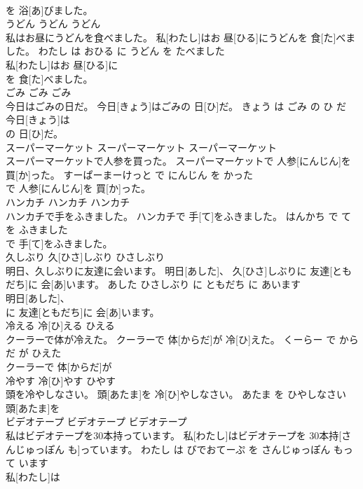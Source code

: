 \documentclass[8pt]{extreport}
\begin{document}
\begin{CJK}{UTF8}{min}
\\	を 浴[あ]びました。			
\\	うどん	うどん	うどん	
\\	私はお昼にうどんを食べました。	私[わたし]はお 昼[ひる]にうどんを 食[た]べました。	わたし は おひる に うどん を たべました	
\\	私[わたし]はお 昼[ひる]に
\\	を 食[た]べました。			
\\	ごみ	ごみ	ごみ	
\\	今日はごみの日だ。	今日[きょう]はごみの 日[ひ]だ。	きょう は ごみ の ひ だ	
\\	今日[きょう]は
\\	の 日[ひ]だ。			
\\	スーパーマーケット	スーパーマーケット	スーパーマーケット	
\\	スーパーマーケットで人参を買った。	スーパーマーケットで 人参[にんじん]を 買[か]った。	すーぱーまーけっと で にんじん を かった	
\\	で 人参[にんじん]を 買[か]った。			
\\	ハンカチ	ハンカチ	ハンカチ	
\\	ハンカチで手をふきました。	ハンカチで 手[て]をふきました。	はんかち で て を ふきました	
\\	で 手[て]をふきました。			
\\	久しぶり	久[ひさ]しぶり	ひさしぶり	
\\	明日、久しぶりに友達に会います。	明日[あした]、 久[ひさ]しぶりに 友達[ともだち]に 会[あ]います。	あした ひさしぶり に ともだち に あいます	
\\	明日[あした]、
\\	に 友達[ともだち]に 会[あ]います。			
\\	冷える	冷[ひ]える	ひえる	
\\	クーラーで体が冷えた。	クーラーで 体[からだ]が 冷[ひ]えた。	くーらー で からだ が ひえた	
\\	クーラーで 体[からだ]が
\\	冷やす	冷[ひ]やす	ひやす	
\\	頭を冷やしなさい。	頭[あたま]を 冷[ひ]やしなさい。	あたま を ひやしなさい	
\\	頭[あたま]を
\\	ビデオテープ	ビデオテープ	ビデオテープ	
\\	私はビデオテープを30本持っています。	私[わたし]はビデオテープを 30本持[さんじゅっぽん も]っています。	わたし は びでおてーぷ を さんじゅっぽん もって います	
\\	私[わたし]は

\end{CJK}
\end{document}
